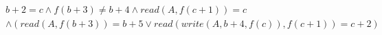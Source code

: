 \begin{align*}
%
& %
b + 2 = c
%
\land
%
f(b + 3)  \neq  b + 4
%
\land
%
\mathit{read}(A,f(c + 1)) = c
~\\~
& %
%
\land
%
(\mathit{read}(A,f(b + 3)) = b + 5 \lor \mathit{read}(\mathit{write}(A,b + 4,f(c)),f(c + 1)) = c + 2)
%
\end{align*}
